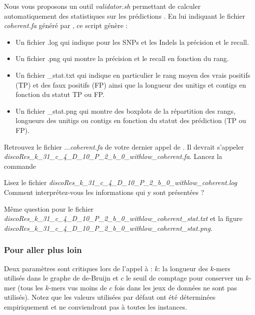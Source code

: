 Nous vous proposons un outil \emph{validator.sh} permettant de calculer automatiquement des statistiques sur les prédictions \discopp. En lui indiquant le fichier \emph{coherent.fa} généré par \discopp, ce script génère :
\begin{itemize}
       \item Un fichier .log qui indique pour les SNPs et les Indels la précision et le recall. 
       \item Un fichier .png qui montre la précision et le recall en fonction du rang. 
       \item Un fichier \_stat.txt qui indique en particulier le rang moyen des vrais positifs (TP) et des faux positifs (FP) ainsi que la longueur des unitigs et contigs en fonction du statut TP ou FP.
       \item Un fichier \_stat.png qui montre des boxplots de la répartition des rangs, longueurs des unitigs ou contigs en fonction du statut des prédiction (TP ou FP).
\end{itemize}

\qu Retrouvez le fichier \emph{$\dots$coherent.fa} de votre dernier appel de \discopp. Il devrait s'appeler \emph{discoRes\_k\_31\_c\_4\_D\_10\_P\_2\_b\_0\_withlow\_coherent.fa}. Lancez la commande 

\qu Lisez le fichier \emph{discoRes\_k\_31\_c\_4\_D\_10\_P\_2\_b\_0\_withlow\_coherent.log}
Comment interprétez-vous les informations qui y sont présentées ?

\qu Même question pour le fichier \emph{discoRes\_k\_31\_c\_4\_D\_10\_P\_2\_b\_0\_withlow\_coherent\_stat.txt} et la figure \emph{discoRes\_k\_31\_c\_4\_D\_10\_P\_2\_b\_0\_withlow\_coherent\_stat.png}.


%

\subsubsection*{Pour aller plus loin} %
\label{ssub:pour_aller_plus_loin}
Deux paramètres sont critiques lors de l'appel à \discopp: $k$: la longueur des $k$-mers utilisés dans le graphe de de-Bruijn et $c$ le seuil de comptage pour conserver un $k$-mer (tous les $k$-mers vus moins de $c$ fois dans les jeux de données ne sont pas utilisés). Notez que les valeurs utilisées par défaut ont été déterminées empiriquement et ne conviendront pas à toutes les instances. 

